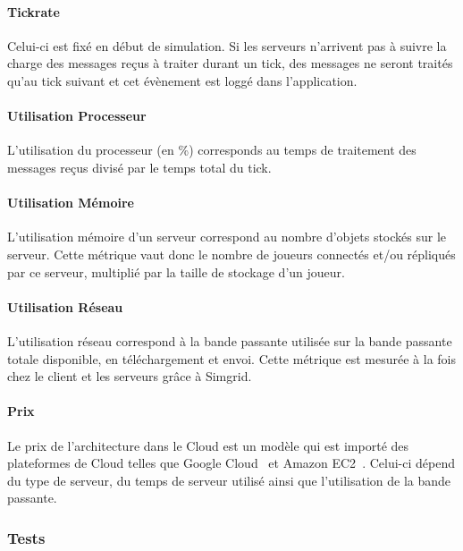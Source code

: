 \paragraph{Tickrate\\}
Celui-ci est fixé en début de simulation.
Si les serveurs n'arrivent pas à suivre la charge des messages reçus à traiter durant un tick, des messages ne seront traités qu'au tick suivant et cet évènement est loggé dans l'application.

\paragraph{Utilisation Processeur\\}
L'utilisation du processeur (en \%) corresponds au temps de traitement des messages reçus divisé par le temps total du tick.

\paragraph{Utilisation Mémoire\\}
L'utilisation mémoire d'un serveur correspond au nombre d'objets stockés sur le serveur.
Cette métrique vaut donc le nombre de joueurs connectés et/ou répliqués par ce serveur, multiplié par la taille de stockage d'un joueur.

\paragraph{Utilisation Réseau\\}
L'utilisation réseau correspond à la bande passante utilisée sur la bande passante totale disponible, en téléchargement et envoi.
Cette métrique est mesurée à la fois chez le client et les serveurs grâce à Simgrid.

\paragraph{Prix\\}
Le prix de l'architecture dans le Cloud est un modèle qui est importé des plateformes de Cloud telles que Google Cloud~\cite{google_cloud} et Amazon EC2~\cite{amazon_ec2}.
Celui-ci dépend du type de serveur, du temps de serveur utilisé ainsi que l'utilisation de la bande passante.

\subsubsection{Tests}

